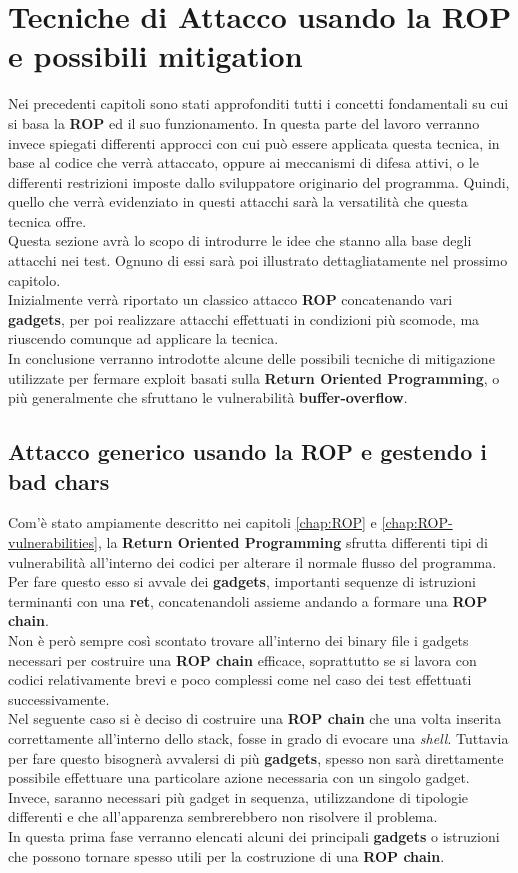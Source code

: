 \chapter{Tecniche di Attacco usando la ROP e possibili mitigation}
\label{chap:Attacks}
Nei precedenti capitoli sono stati approfonditi tutti i concetti fondamentali su cui si basa la \textbf{ROP} ed il suo funzionamento. In questa parte del lavoro verranno invece spiegati differenti approcci con cui può 
essere applicata questa tecnica, in base al codice che verrà attaccato, oppure ai meccanismi di difesa attivi, o le differenti restrizioni imposte dallo sviluppatore originario del programma. Quindi, quello che 
verrà evidenziato in questi attacchi sarà la versatilità che questa tecnica offre.\\
Questa sezione avrà lo scopo di introdurre le idee che stanno alla base degli attacchi nei test. Ognuno di essi sarà poi illustrato dettagliatamente nel prossimo capitolo.\\
Inizialmente verrà riportato un classico attacco \textbf{ROP} concatenando vari \textbf{gadgets}, per poi realizzare attacchi effettuati in condizioni più scomode, ma riuscendo comunque ad applicare la tecnica.\\
In conclusione verranno introdotte alcune delle possibili tecniche di mitigazione utilizzate per fermare exploit basati sulla \textbf{Return Oriented Programming}, o più generalmente che sfruttano le vulnerabilità \textbf{buffer-overflow}.

\section{Attacco generico usando la ROP e gestendo i bad chars}
\label{sec:Attack_1}
Com'è stato ampiamente descritto nei capitoli \ref{chap:ROP} e \ref{chap:ROP-vulnerabilities}, la \textbf{Return Oriented Programming} sfrutta differenti tipi di vulnerabilità all'interno dei codici per alterare il normale 
flusso del programma. Per fare questo esso si avvale dei \textbf{gadgets}, importanti sequenze di istruzioni terminanti con una \textbf{ret}, concatenandoli assieme andando a formare una \textbf{ROP chain}.\\
Non è però sempre così scontato trovare all'interno dei binary file i gadgets necessari per costruire una \textbf{ROP chain} efficace, soprattutto se si lavora con codici relativamente brevi e poco complessi come nel caso dei 
test effettuati successivamente.\\
Nel seguente caso si è deciso di costruire una \textbf{ROP chain} che una volta inserita correttamente all'interno dello stack, fosse in grado di evocare una \textit{shell}. Tuttavia per fare questo bisognerà avvalersi di più \textbf{gadgets},
spesso non sarà direttamente possibile effettuare una particolare azione necessaria con un singolo gadget. Invece, saranno necessari più gadget in sequenza, utilizzandone di tipologie differenti e che all'apparenza 
sembrerebbero non risolvere il problema.\\ 
In questa prima fase verranno elencati alcuni dei principali \textbf{gadgets} o istruzioni che possono tornare spesso utili per la costruzione di una \textbf{ROP chain}.

